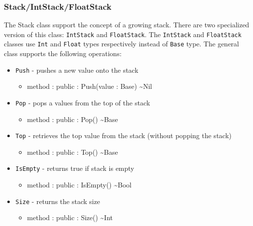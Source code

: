 \documentclass[12pt]{article}
\begin{document}
\subsubsection{Stack/IntStack/FloatStack}
The Stack class support the concept of a growing stack.  There are two
specialized version of this class: \texttt{IntStack} and
\texttt{FloatStack}.  The \texttt{IntStack} and \texttt{FloatStack}
classes use \texttt{Int} and \texttt{Float} types respectively instead
of \texttt{Base} type.  The general class supports the following
operations:
\begin{itemize}
\item \texttt{Push} - pushes a new value onto the stack
  \begin{itemize}
  \item method : public : Push(value : Base) \textasciitilde Nil
  \end{itemize}
\item \texttt{Pop} - pops a values from the top of the stack
  \begin{itemize}
  \item method : public : Pop() \textasciitilde Base
  \end{itemize}
\item \texttt{Top} - retrieves the top value from the stack (without
  popping the stack)
  \begin{itemize}
  \item method : public : Top() \textasciitilde Base
  \end{itemize}
\item \texttt{IsEmpty} - returns true if stack is empty
  \begin{itemize}
  \item method : public : IsEmpty() \textasciitilde Bool
  \end{itemize}
\item \texttt{Size} - returns the stack size
  \begin{itemize}
  \item method : public : Size() \textasciitilde Int
  \end{itemize}
\end{itemize}
\end{document}
